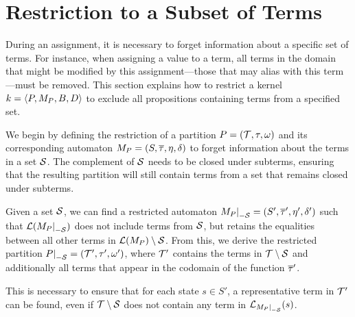 \section{Restriction to a Subset of Terms}

During an assignment, it is necessary to forget information about a specific set of terms.
For instance, when assigning a value to a term, all terms in the domain that might be modified by this assignment---those that may alias with this term---must be removed.
This section explains how to restrict a kernel $k = \langle P, M_P, B, D\rangle$
to exclude all propositions containing terms from a specified set.

We begin by defining the restriction of a partition $P = (\mathcal{T}, \tau, \omega)$ and its corresponding automaton $M_P = (S, \overline{\tau}, \eta, \delta)$ to forget information about the terms in a set $\mathcal{S}$.
The complement of $\mathcal{S}$ needs to be closed under subterms, ensuring that the
resulting partition will still contain terms from a set that remains closed under subterms.

Given a set $\mathcal{S}$, we can find a restricted
automaton $\restr{M_P}{-\Set} = (S', \otau', \eta', \delta')$ such that $\L(\restr{M_P}{-\Set})$ does not include terms from
$\mathcal{S}$, but retains the equalities between all other terms in $\mathcal{L}(M_P) \setminus \mathcal{S}$.
From this, we derive the restricted partition $\restr{P}{-\Set} = (\T', \tau', \omega')$, where $\mathcal{T}'$ contains
the terms in $\mathcal{T} \setminus \mathcal{S}$ and additionally all terms that appear in the codomain of the function $\overline{\tau}'$.

This is necessary to ensure that for each state $s \in S'$, a representative term in $\mathcal{T}'$ can be found,
even if $\mathcal{T} \setminus \mathcal{S}$ does not contain any term in $\L_{\restr{M_P}{-\Set}}(s)$.

